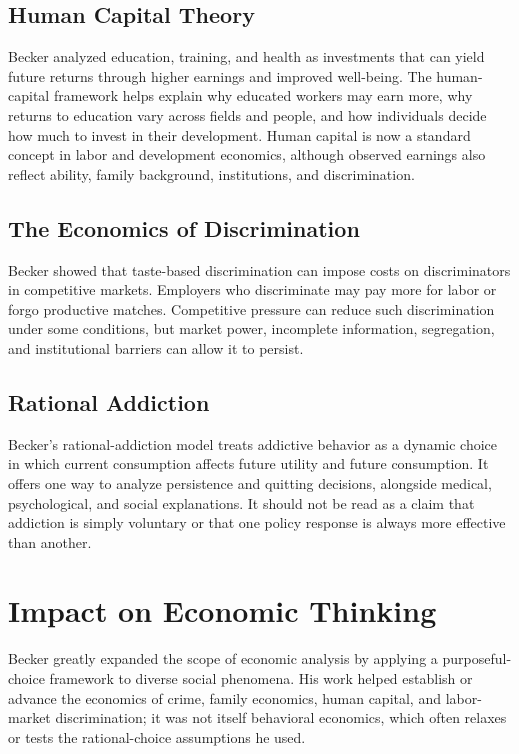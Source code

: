 \subsection*{Human Capital Theory}
Becker analyzed education, training, and health as investments that can yield
future returns through higher earnings and improved well-being. The human-
capital framework helps explain why educated workers may earn more, why returns
to education vary across fields and people, and how individuals decide how much
to invest in their development. Human capital is now a standard concept in
labor and development economics, although observed earnings also reflect
ability, family background, institutions, and discrimination.

\subsection*{The Economics of Discrimination}
Becker showed that taste-based discrimination can impose costs on discriminators
in competitive markets. Employers who discriminate may pay more for labor or
forgo productive matches. Competitive pressure can reduce such discrimination
under some conditions, but market power, incomplete information, segregation,
and institutional barriers can allow it to persist.

\subsection*{Rational Addiction}
Becker's rational-addiction model treats addictive behavior as a dynamic choice
in which current consumption affects future utility and future consumption. It
offers one way to analyze persistence and quitting decisions, alongside medical,
psychological, and social explanations. It should not be read as a claim that
addiction is simply voluntary or that one policy response is always more
effective than another.

\section{Impact on Economic Thinking}
Becker greatly expanded the scope of economic analysis by applying a purposeful-
choice framework to diverse social phenomena. His work helped establish or
advance the economics of crime, family economics, human capital, and labor-market
discrimination; it was not itself behavioral economics, which often relaxes or
tests the rational-choice assumptions he used.

